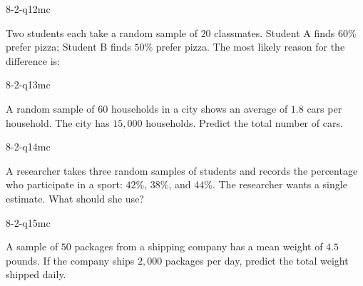 \begin{practiceQuestion}{8-2-q12}{mc}
\begin{questionText}
Two students each take a random sample of $20$ classmates. Student A finds $60\%$ prefer pizza; Student B finds $50\%$ prefer pizza. The most likely reason for the difference is:
\end{questionText}
\end{practiceQuestion}

\begin{practiceQuestion}{8-2-q13}{mc}
\begin{questionText}
A random sample of $60$ households in a city shows an average of $1.8$ cars per household. The city has $15{,}000$ households. Predict the total number of cars.
\end{questionText}
\end{practiceQuestion}

\begin{practiceQuestion}{8-2-q14}{mc}
\begin{questionText}
A researcher takes three random samples of students and records the percentage who participate in a sport: $42\%$, $38\%$, and $44\%$. The researcher wants a single estimate. What should she use?
\end{questionText}
\end{practiceQuestion}

\begin{practiceQuestion}{8-2-q15}{mc}
\begin{questionText}
A sample of $50$ packages from a shipping company has a mean weight of $4.5$ pounds. If the company ships $2{,}000$ packages per day, predict the total weight shipped daily.
\end{questionText}
\end{practiceQuestion}

